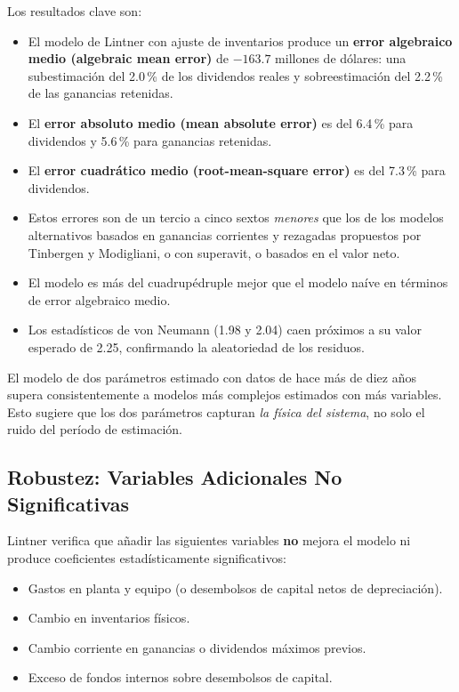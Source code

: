 \documentclass[12pt]{article}
\begin{document}
Los resultados clave son:

\begin{itemize}
  \item El modelo de Lintner con ajuste de inventarios produce un \textbf{error algebraico
        medio (algebraic mean error)} de $-163.7$ millones de d\'olares: una
        subestimaci\'on del 2.0\,\% de los dividendos reales y sobreestimaci\'on del 2.2\,\%
        de las ganancias retenidas.
  \item El \textbf{error absoluto medio (mean absolute error)} es del 6.4\,\% para
        dividendos y 5.6\,\% para ganancias retenidas.
  \item El \textbf{error cuadr\'atico medio (root-mean-square error)} es del 7.3\,\% para
        dividendos.
  \item Estos errores son de un tercio a cinco sextos \textit{menores} que los de los modelos
        alternativos basados en ganancias corrientes y rezagadas propuestos por Tinbergen
        y Modigliani, o con superavit, o basados en el valor neto.
  \item El modelo es m\'as del cuadrup\'edruple mejor que el modelo na\'ive en t\'erminos
        de error algebraico medio.
  \item Los estad\'isticos de von Neumann (1.98 y 2.04) caen pr\'oximos a su valor esperado
        de 2.25, confirmando la aleatoriedad de los residuos.
\end{itemize}

\begin{intuicion}
El modelo de dos par\'ametros estimado con datos de hace m\'as de diez a\~nos supera
consistentemente a modelos m\'as complejos estimados con m\'as variables. Esto sugiere
que los dos par\'ametros capturan \textit{la f\'isica del sistema}, no solo el ruido del
per\'iodo de estimaci\'on.
\end{intuicion}

\subsection{Robustez: Variables Adicionales No Significativas}

Lintner verifica que a\~nadir las siguientes variables \textbf{no} mejora el modelo
ni produce coeficientes estad\'isticamente significativos:

\begin{itemize}
  \item Gastos en planta y equipo (o desembolsos de capital netos de depreciaci\'on).
  \item Cambio en inventarios f\'isicos.
  \item Cambio corriente en ganancias o dividendos m\'aximos previos.
  \item Exceso de fondos internos sobre desembolsos de capital.
\end{itemize}
\end{document}
